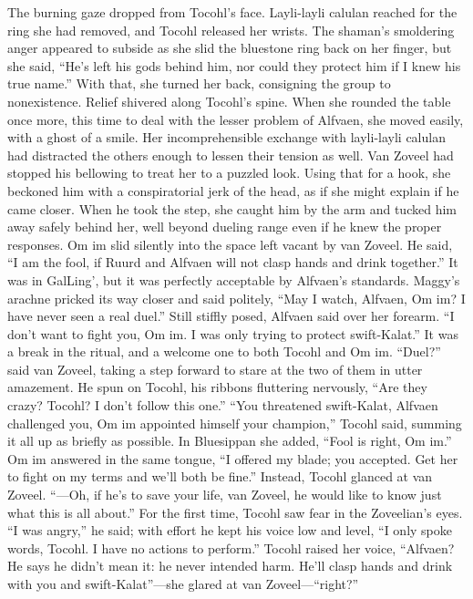 \documentclass[9pt]{article}
\begin{document}
The burning gaze dropped from Tocohl’s face. Layli-layli calulan reached for the ring she had
removed, and Tocohl released her wrists. The shaman’s smoldering anger appeared to subside as she
slid the bluestone ring back on her finger, but she said, “He’s left his gods behind him, nor could they
protect him if I knew his true name.”
With that, she turned her back, consigning the group to nonexistence.
Relief shivered along Tocohl’s spine. When she rounded the table once more, this time to deal with
the lesser problem of Alfvaen, she moved easily, with a ghost of a smile. Her incomprehensible exchange
with layli-layli calulan had distracted the others enough to lessen their tension as well. Van Zoveel had
stopped his bellowing to treat her to a puzzled look. Using that for a hook, she beckoned him with a
conspiratorial jerk of the head, as if she might explain if he came closer. When he took the step, she
caught him by the arm and tucked him away safely behind her, well beyond dueling range even if he knew
the proper responses.
Om im slid silently into the space left vacant by van Zoveel. He said, “I am the fool, if Ruurd and
Alfvaen will not clasp hands and drink together.” It was in GalLing’, but it was perfectly acceptable by
Alfvaen’s standards.
Maggy’s arachne pricked its way closer and said politely, “May I watch, Alfvaen, Om im? I have
never seen a real duel.”
Still stiffly posed, Alfvaen said over her forearm. “I don’t want to fight you, Om im. I was only trying
to protect swift-Kalat.” It was a break in the ritual, and a welcome one to both Tocohl and Om im.
“Duel?” said van Zoveel, taking a step forward to stare at the two of them in utter amazement. He
spun on Tocohl, his ribbons fluttering nervously, “Are they crazy? Tocohl? I don’t follow this one.”
“You threatened swift-Kalat, Alfvaen challenged you, Om im appointed himself your champion,”
Tocohl said, summing it all up as briefly as possible. In Bluesippan she added, “Fool is right, Om im.”
Om im answered in the same tongue, “I offered my blade; you accepted. Get her to fight on my
terms and we’ll both be fine.”
Instead, Tocohl glanced at van Zoveel. “—Oh, if he’s to save your life, van Zoveel, he would like to
know just what this is all about.”
For the first time, Tocohl saw fear in the Zoveelian’s eyes. “I was angry,” he said; with effort he kept
his voice low and level, “I only spoke words, Tocohl. I have no actions to perform.”
Tocohl raised her voice, “Alfvaen? He says he didn’t mean it: he never intended harm. He’ll clasp
hands and drink with you and swift-Kalat”—she glared at van Zoveel—“right?”
\end{document}
